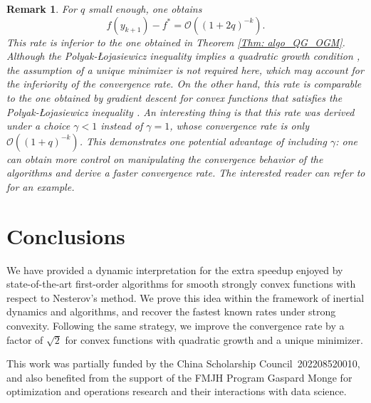 \documentclass[pdflatex,sn-mathphys-num]{sn-jnl}
\theoremstyle{thmstyleone}
\theoremstyle{thmstyletwo}
\newtheorem{remark}{Remark}
\theoremstyle{thmstylethree}
\newenvironment{acknowledgements}{\begin{acknowledgement}}
{\end{acknowledgement}}
\begin{document}
\begin{remark}
For $q$ small enough, one obtains
$$ f(y_{k+1}) - f^* = \mathcal{O}\left( (1+2q)^{-k} \right). $$
This rate is inferior to the one obtained in Theorem \ref{Thm: algo_QG_OGM}. Although the Polyak-\L ojasiewicz inequality implies a quadratic growth condition \cite{Bolte_2017}, the assumption of a unique minimizer is not required here, which may account for the inferiority of the convergence rate. On the other hand, this rate is comparable to the one obtained by gradient descent for convex functions that satisfies the Polyak-\L ojasiewicz inequality \cite[Corollary 3.1]{Zhang_2019}. An interesting thing is that this rate was derived under a choice $\gamma<1$ instead of $\gamma=1$, whose convergence rate is only $\mathcal{O}\left( (1+q)^{-k} \right)$. This demonstrates one potential advantage of including $\gamma$: one can obtain more control on manipulating the convergence behavior of the algorithms and derive a faster convergence rate. The interested reader can refer to \cite{Wang_2025_MAPM} for an example.    
\end{remark}




\section{Conclusions}\label{Sec: conclusions}

We have provided a dynamic interpretation for the extra speedup enjoyed by state-of-the-art first-order algorithms for smooth strongly convex functions with respect to Nesterov's method. We prove this idea within the framework of inertial dynamics and algorithms, and recover the fastest known rates under strong convexity. Following the same strategy, we improve the convergence rate by a factor of $\sqrt{2}$ for convex functions with quadratic growth and a unique minimizer.





\begin{acknowledgements}
This work was partially funded by the China Scholarship Council~202208520010, and also benefited from the support of the FMJH Program Gaspard Monge for optimization and operations research and their interactions with data science.
\end{acknowledgements}
\end{document}
